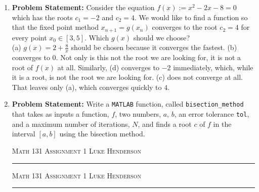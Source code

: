 \documentclass[12pt]{amsart}
\begin{document}
\begin{enumerate}
\item\textbf{Problem Statement:} Consider the equation $f(x) := x^2 - 2x - 8 = 0$ which has the roots $c_1 = -2$ and $c_2 = 4$. We would like to find a function so that the fixed point method $x_{n+1} = g(x_n)$ converges to the root $c_2 = 4$ for every point $x_0 \in [3, 5]$. Which $g(x)$ should we choose? \\
(a) $g(x) = 2 + \frac{8}{x}$ should be chosen because it converges the fastest. (b) converges to 0. Not only is this not the root we are looking for, it is not a root of $f(x)$ at all.  Similarly, (d) converges to $-2$ immediately, which, while it is a root, is not the root we are looking for. (c) does not converge at all. That leaves only (a), which converges quickly to $4$. \\
\bigskip

\item\textbf{Problem Statement:} Write a \texttt{MATLAB} function, called \texttt{bisection\_method} that takes as inputs a function, $f$, two numbers, $a$, $b$, an error tolerance \texttt{tol}, and a maximum number of iterations, $N$, and finds a root $c$ of $f$ in the interval $[a, b]$ using the bisection method. \\
\bigskip

\newpage
{\scshape Math 131} \hfill {\scshape \large Assignment 1} \hfill {\scshape Luke Henderson}
\smallskip
\hrule
\bigskip

\begin{multicols}{2}
    
\columnbreak
    
\end{multicols}

\newpage
{\scshape Math 131} \hfill {\scshape \large Assignment 1} \hfill {\scshape Luke Henderson}
\smallskip
\hrule
\bigskip


\end{enumerate}
\end{document}
